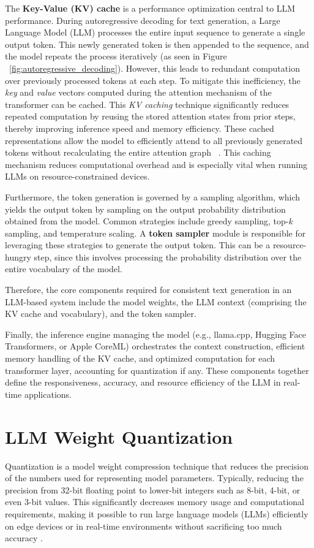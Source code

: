 The \textbf{Key-Value (KV) cache} is a performance optimization central to LLM performance. During autoregressive decoding for text generation, a Large Language Model (LLM) processes the entire input sequence to generate a single output token. This newly generated token is then appended to the sequence, and the model repeats the process iteratively (as seen in Figure ~\ref{fig:autoregressive_decoding}). However, this leads to redundant computation over previously processed tokens at each step. To mitigate this inefficiency, the \textit{key} and \textit{value} vectors computed during the attention mechanism of the transformer can be cached. This \textit{KV caching} technique significantly reduces repeated computation by reusing the stored attention states from prior steps, thereby improving inference speed and memory efficiency. These cached representations allow the model to efficiently attend to all previously generated tokens without recalculating the entire attention graph ~\cite{alammar2018illustrated}. This caching mechanism reduces computational overhead and is especially vital when running LLMs on resource-constrained devices.

Furthermore, the token generation is governed by a sampling algorithm, which yields the output token by sampling on the output probability distribution obtained from the model. Common strategies include greedy sampling, top-$k$ sampling, and temperature scaling. A \textbf{token sampler} module is responsible for leveraging these strategies to generate the output token. This can be a resource-hungry step, since this involves processing the probability distribution over the entire vocabulary of the model.

Therefore, the core components required for consistent text generation in an LLM-based system include the model weights, the LLM context (comprising the KV cache and vocabulary), and the token sampler.

Finally, the inference engine managing the model (e.g., llama.cpp, Hugging Face Transformers, or Apple CoreML) orchestrates the context construction, efficient memory handling of the KV cache, and optimized computation for each transformer layer, accounting for quantization if any. These components together define the responsiveness, accuracy, and resource efficiency of the LLM in real-time applications.

\section{LLM Weight Quantization}
\label{sec:LLMWeightQuantization} 
Quantization is a model weight compression technique that reduces the precision of the numbers used for representing model parameters. Typically, reducing the precision from 32-bit floating point to lower-bit integers such as 8-bit, 4-bit, or even 3-bit values. This significantly decreases memory usage and computational requirements, making it possible to run large language models (LLMs) efficiently on edge devices or in real-time environments without sacrificing too much accuracy \cite{jacob2017quantization,hubara2016quantized}.

